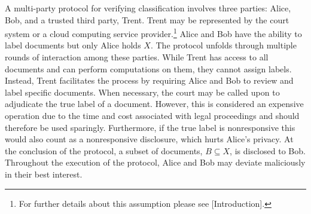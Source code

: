 A multi-party protocol for verifying classification involves three parties: Alice, Bob, and a trusted third party, Trent. Trent may be represented by the court system or a cloud computing service provider.\footnote{For further details about this assumption please see \cite*{dong2022classification}[Introduction].}  
Alice and Bob have the ability to label documents but only Alice holds $X$.
The protocol unfolds through multiple rounds of interaction among these parties.
While Trent has access to all documents and can perform computations on them, they cannot assign labels.
Instead, Trent facilitates the process by requiring Alice and Bob to review and label specific documents.
When necessary, the court may be called upon to adjudicate the true label of a document. However, this is considered an expensive operation due to the time and cost associated with legal proceedings and should therefore be used sparingly.
Furthermore, if the true label is nonresponsive this would also count as a nonresponsive disclosure, which hurts Alice's privacy.
At the conclusion of the protocol, a subset of documents, $B \subseteq X$, is disclosed to Bob.
Throughout the execution of the protocol, Alice and Bob may deviate maliciously in their best interest.



